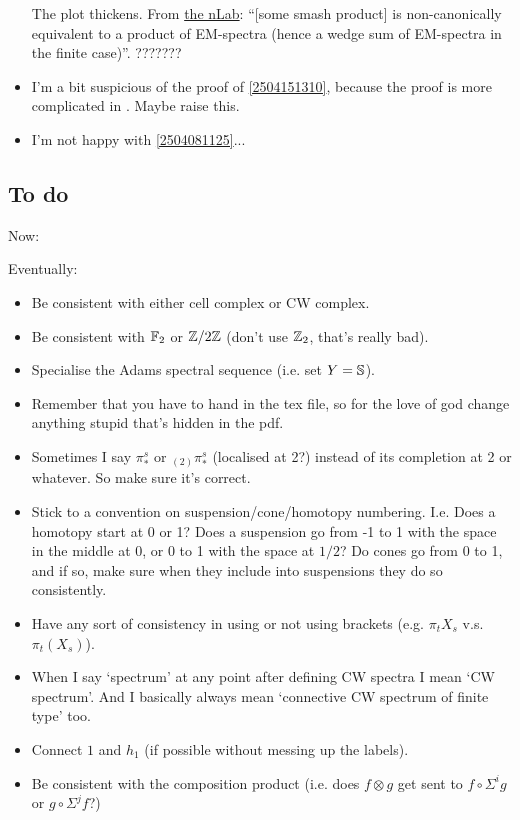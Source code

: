 \documentclass{MetricNotes2023}
\def\bb{\ensuremath\mathbb}
\def\inte{\ensuremath\mathbb{Z}}
\begin{document}
\begin{itemize}
The plot thickens. From \href{https://ncatlab.org/nlab/show/Eilenberg-Mac+Lane+spectrum}{the nLab}: ``[some smash product] is non-canonically equivalent to a product of EM-spectra (hence a wedge sum of EM-spectra in the finite case)''. ???????

\item I'm a bit suspicious of the proof of \ref{2504151310}, because the proof is more complicated in \autocite{hatcher5}. Maybe raise this.

\item I'm not happy with \ref{2504081125}...
\end{itemize}

\subsection{To do}\label{2503221342}

Now:

Eventually:

\begin{itemize}
\item Be consistent with either cell complex or CW complex.

\item Be consistent with \(\bb{F}_2\)  or \(\inte/2\inte\) (don't use \(\inte_2\), that's really bad).

\item Specialise the Adams spectral sequence (i.e. set \(Y=\bb{S}\)).

\item Remember that you have to hand in the tex file, so for the love of god change anything stupid that's hidden in the pdf.

\item Sometimes I say \(\pi_*^s\) or \(\text{}_{(2)}\pi_*^s\) (localised at 2?) instead of its completion at 2 or whatever. So make sure it's correct.

\item Stick to a convention on suspension/cone/homotopy numbering. I.e. Does a homotopy start at 0 or 1? Does a suspension go from -1 to 1 with the space in the middle at 0, or 0 to 1 with the space at \(1/2\)? Do cones go from 0 to 1, and if so, make sure when they include into suspensions they do so consistently. 

\item Have any sort of consistency in using or not using brackets (e.g. \(\pi_t X_s\) v.s. \(\pi_t(X_s)\)). 

\item When I say `spectrum' at any point after defining CW spectra I mean `CW spectrum'. And I basically always mean `connective CW spectrum of finite type' too. 

\item Connect \(1\) and \(h_1\) (if possible without messing up the labels). 

\item Be consistent with the composition product (i.e. does \(f \otimes g\) get sent to \(f\circ \Sigma^ig\) or \(g \circ \Sigma^j f\)?)

\end{itemize}
\end{document}
